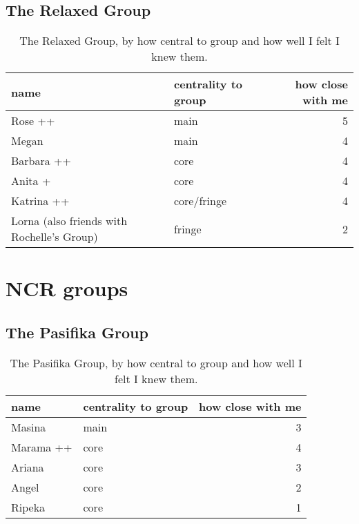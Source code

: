 \subsection{The Relaxed Group}
\nopagebreak
\begin{table}[ht]
\caption{The Relaxed Group, by how central to group and how well I felt I knew them.}	\label{append:Relaxed}
	\centering
		\begin{tabular}{llr} \\
		\hline
							name & centrality to group & how close with me  \\
			\hline
Rose ++ & main & 5 \\
Megan & main & 4 \\
Barbara ++ & core & 4 \\
Anita + & core & 4 \\
Katrina ++ & core/fringe & 4 \\
Lorna (also friends with Rochelle's Group) & fringe & 2 \\
   \hline
		\end{tabular}
\end{table}
\mbox{}

\pagebreak




\bigskip

\pagebreak
\section{NCR groups}
\nopagebreak
\subsection{The Pasifika Group}
\nopagebreak
\begin{table}[ht]
\caption{The Pasifika Group, by how central to group and how well I felt I knew them.}\label{append:Pasifika}
	\centering
		\begin{tabular}{llr} \\
		\hline
					name & centrality to group & how close with me  \\
			\hline
Masina & main & 3 \\
Marama ++ & core & 4 \\
Ariana & core & 3 \\
Angel  & core & 2 \\
Ripeka & core & 1 \\
   \hline
				\end{tabular}
\end{table}


